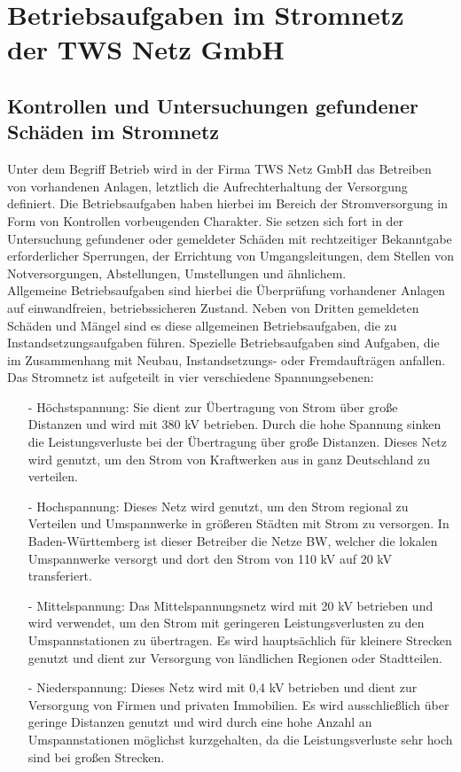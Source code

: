 \chapter{Betriebsaufgaben im Stromnetz der TWS Netz GmbH}
\label{cha:Betriebsaufgaben}

\section{Kontrollen und Untersuchungen gefundener Schäden im Stromnetz}

Unter dem Begriff Betrieb wird in der Firma TWS Netz GmbH das Betreiben von vorhandenen Anlagen, letztlich die Aufrechterhaltung der Versorgung definiert. 
Die Betriebsaufgaben haben hierbei im Bereich der Stromversorgung in Form von Kontrollen vorbeugenden Charakter. Sie setzen sich fort in der Untersuchung gefundener 
oder gemeldeter Schäden mit rechtzeitiger Bekanntgabe erforderlicher Sperrungen, der Errichtung von Umgangsleitungen, dem Stellen von Notversorgungen, 
Abstellungen, Umstellungen und ähnlichem.
\\
Allgemeine Betriebsaufgaben sind hierbei die Überprüfung vorhandener Anlagen auf einwandfreien, betriebssicheren Zustand. Neben von Dritten gemeldeten Schäden
und Mängel sind es diese allgemeinen Betriebsaufgaben, die zu Instandsetzungsaufgaben führen. Spezielle Betriebsaufgaben sind Aufgaben, die im Zusammenhang 
mit Neubau, Instandsetzungs- oder Fremdaufträgen anfallen. Das Stromnetz ist aufgeteilt in vier verschiedene Spannungsebenen: 
\begin{itemize}
    \item[-] Höchstspannung: Sie dient zur Übertragung von Strom über große Distanzen und wird mit 380 kV betrieben. Durch die hohe Spannung sinken die 
    Leistungsverluste bei der Übertragung über große Distanzen. Dieses Netz wird genutzt, um den Strom von Kraftwerken aus in ganz Deutschland zu verteilen.
    \item[-] Hochspannung: Dieses Netz wird genutzt, um den Strom regional zu Verteilen und Umspannwerke in größeren Städten mit Strom zu versorgen. 
    In Baden-Württemberg ist dieser Betreiber die Netze BW, welcher die lokalen Umspannwerke versorgt und dort den Strom von 110 kV auf 20 kV transferiert.
    \clearpage
    \item[-] Mittelspannung: Das Mittelspannungsnetz wird mit 20 kV betrieben und wird verwendet, um den Strom mit geringeren Leistungsverlusten zu den 
    Umspannstationen zu übertragen. Es wird hauptsächlich für kleinere Strecken genutzt und dient zur Versorgung von ländlichen Regionen oder Stadtteilen.
    \item[-] Niederspannung: Dieses Netz wird mit 0,4 kV betrieben und dient zur Versorgung von Firmen und privaten Immobilien. Es wird ausschließlich über 
    geringe Distanzen genutzt und wird durch eine hohe Anzahl an Umspannstationen möglichst kurzgehalten, da die Leistungsverluste sehr hoch sind bei großen
    Strecken.
\end{itemize}
